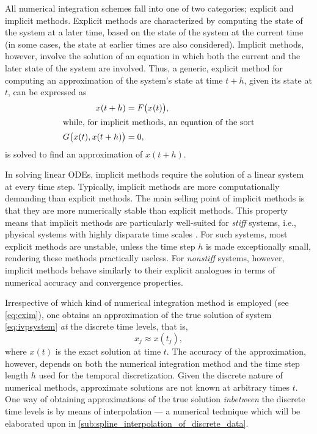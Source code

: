 All numerical integration schemes fall into one of two categories; explicit
and implicit methods. Explicit methods are characterized by computing the state
of the system at a later time, based on the state of the system at the current
time (in some cases, the state at earlier times are also considered). Implicit
methods, however, involve the solution of an equation in which both the
current and the later state of the system are involved. Thus, a generic,
explicit method for computing an approximation of the system's state at time
$t+h$, given its state at $t$, can be expressed as
\begin{subequations}
    \label{eq:exim}
    \begin{align}
        \label{eq:exim_ex}
        x(t+h) &= F\big(x(t)\big),\\
        \intertext{while, for implicit methods, an equation of the sort}
        \label{eq:exim_im}
        G\big(x(t),x(t+h)\big)&=0,
    \end{align}
\end{subequations}
is solved to find an approximation of $x(t+h)$.

In solving linear ODEs, implicit methods require the solution of a linear
system at every time step. Typically, implicit methods are more computationally
demanding than explicit methods. The main selling point of implicit methods is
that they are more numerically stable than explicit methods. This property
means that implicit methods are particularly well-suited for \emph{stiff}
systems, i.e., physical systems with highly disparate time scales
\parencite[p.2]{hairer1996solving}. For such systems, most explicit methods are
unstable, unless the time step $h$ is made exceptionally small, rendering these
methods practically useless. For \emph{nonstiff} systems, however, implicit
methods behave similarly to their explicit analogues in terms of numerical
accuracy and convergence properties.

Irrespective of which kind of numerical integration method is employed (see
\cref{eq:exim}), one obtains an approximation of the true solution of system
\eqref{eq:ivpsystem} \emph{at} the discrete time levels, that is,
\begin{equation}
    \label{eq:num_int_approx_sol}
    x_{j} \approx x(t_{j}),
\end{equation}
where $x(t)$ is the exact solution at time $t$. The accuracy of the
approximation, however, depends on both the numerical integration method and
the time step length $h$ used for the temporal discretization. Given the
discrete nature of numerical methods, approximate solutions are not known at
arbitrary times $t$. One way of obtaining approximations of the true solution
\emph{inbetween} the discrete time levels is by means of interpolation --- a
numerical technique which will be elaborated upon in
\cref{sub:spline_interpolation_of_discrete_data}.
